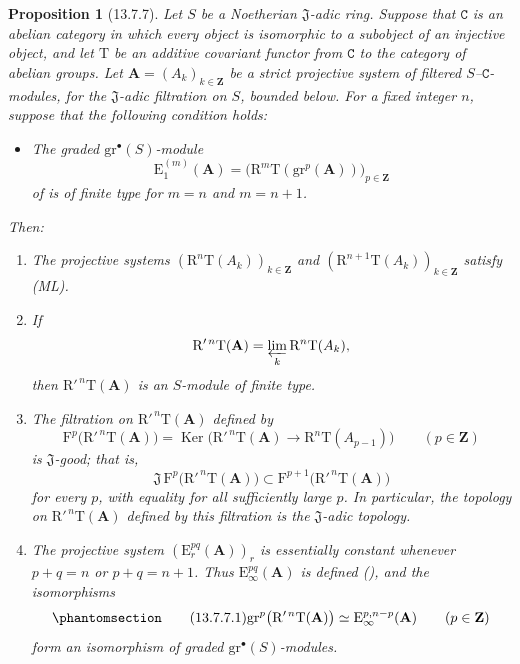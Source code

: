 \documentclass[oneside]{amsart}
\theoremstyle{ega-env-style}
\theoremstyle{ega-thm-env-style}
\newtheorem*{proposition}{Proposition}
\theoremstyle{ega-defn-env-style}
\def\bb{\mathbf}                    %
\def\cat{\mathtt}                   %
\def\RR{\mathrm{R}}                 %
\def\Ker{\operatorname{Ker}}
\def\isoto{\simeq} %
\newcommand{\oldpage}[2][]{{\marginnote{\normalfont{\textbf{#1}~|~#2}}}\ignorespaces}
\let\EGAOriginalLabel\label
\renewcommand{\label}[1]{\phantomsection\EGAOriginalLabel{#1}}
\begin{document}
\begin{proposition}[13.7.7]
\label{0.13.7.7}
Let $S$ be a Noetherian $\mathfrak{J}$-adic ring.
Suppose that $\cat{C}$ is an abelian category in which every object
is isomorphic to a subobject of an injective object, and let
$\mathrm{T}$ be an additive covariant functor from $\cat{C}$ to the
category of abelian groups.
Let $\bb{A}=(A_k)_{k\in\bb{Z}}$ be a
\oldpage[0\textsubscript{III}]{78}
strict projective system of filtered $S$--$\cat{C}$-modules, for the $\mathfrak{J}$-adic
filtration on $S$, bounded below.
For a fixed integer $n$, suppose that the following condition holds:
\begin{itemize}
  \item[$(\mathrm{F}_n)$]
  \emph{The graded $\mathrm{gr}^\bullet(S)$-module}
  \[
    \mathrm{E}_1^{(m)}(\bb{A})
    =
    \bigl(
      \RR^m\mathrm{T}(\mathrm{gr}^p(\bb{A}))
    \bigr)_{p\in\bb{Z}}
  \]
  \emph{of  is of finite type for
  $m=n$ and $m=n+1$.}
\end{itemize}
Then:
\begin{enumerate}
  \item[{\rm(i)}] The projective systems
  $(\RR^n\mathrm{T}(A_k))_{k\in\bb{Z}}$ and
  $(\RR^{n+1}\mathrm{T}(A_k))_{k\in\bb{Z}}$ satisfy {\rm(ML)}.
  \item[{\rm(ii)}] If
  \[
    \RR'^{\,n}\mathrm{T}(\bb{A})
    =
    \varprojlim_k\RR^n\mathrm{T}(A_k),
  \]
  then $\RR'^{\,n}\mathrm{T}(\bb{A})$ is an $S$-module of finite
  type.
  \item[{\rm(iii)}] The filtration on
  $\RR'^{\,n}\mathrm{T}(\bb{A})$ defined by
  \[
    \mathrm{F}^p\bigl(\RR'^{\,n}\mathrm{T}(\bb{A})\bigr)
    =
    \Ker\bigl(
      \RR'^{\,n}\mathrm{T}(\bb{A})
      \longrightarrow
      \RR^n\mathrm{T}(A_{p-1})
    \bigr)
    \qquad(p\in\bb{Z})
  \]
  is $\mathfrak{J}$-good; that is,
  \[
    \mathfrak{J}\,
    \mathrm{F}^p\bigl(\RR'^{\,n}\mathrm{T}(\bb{A})\bigr)
    \subset
    \mathrm{F}^{p+1}\bigl(\RR'^{\,n}\mathrm{T}(\bb{A})\bigr)
  \]
  for every $p$, with equality for all sufficiently large $p$.
  In particular, the topology on
  $\RR'^{\,n}\mathrm{T}(\bb{A})$ defined by this filtration is the
  $\mathfrak{J}$-adic topology.
  \item[{\rm(iv)}] The projective system
  $(\mathrm{E}_r^{pq}(\bb{A}))_r$ is essentially constant whenever
  $p+q=n$ or $p+q=n+1$.
  Thus $\mathrm{E}_\infty^{pq}(\bb{A})$ is defined
  (), and the isomorphisms
  \begin{equation}
  \label{0.13.7.7.1}
  \tag{13.7.7.1}
    \mathrm{gr}^p\bigl(\RR'^{\,n}\mathrm{T}(\bb{A})\bigr)
    \isoto
    \mathrm{E}_\infty^{p,n-p}(\bb{A})
    \qquad(p\in\bb{Z})
  \end{equation}
  form an isomorphism of graded
  $\mathrm{gr}^\bullet(S)$-modules.
\end{enumerate}
\end{proposition}
\end{document}
